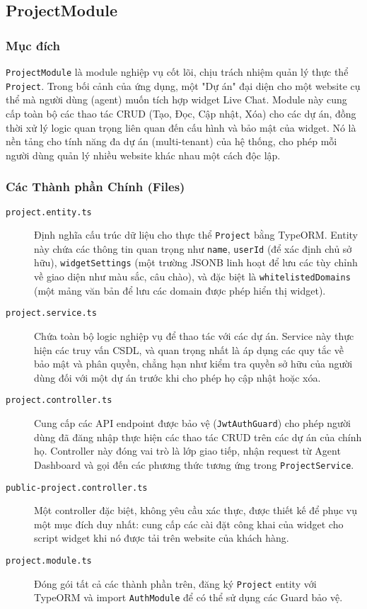 \subsection{ProjectModule}
\label{subsec:project-module}

\subsubsection{Mục đích}

\texttt{ProjectModule} là module nghiệp vụ cốt lõi, chịu trách nhiệm quản lý thực thể \texttt{Project}. Trong bối cảnh của ứng dụng, một "Dự án" đại diện cho một website cụ thể mà người dùng (agent) muốn tích hợp widget Live Chat. Module này cung cấp toàn bộ các thao tác CRUD (Tạo, Đọc, Cập nhật, Xóa) cho các dự án, đồng thời xử lý logic quan trọng liên quan đến cấu hình và bảo mật của widget. Nó là nền tảng cho tính năng đa dự án (multi-tenant) của hệ thống, cho phép mỗi người dùng quản lý nhiều website khác nhau một cách độc lập.

\subsubsection{Các Thành phần Chính (Files)}

\begin{description}
    \item[\texttt{project.entity.ts}] Định nghĩa cấu trúc dữ liệu cho thực thể \texttt{Project} bằng TypeORM. Entity này chứa các thông tin quan trọng như \texttt{name}, \texttt{userId} (để xác định chủ sở hữu), \texttt{widgetSettings} (một trường JSONB linh hoạt để lưu các tùy chỉnh về giao diện như màu sắc, câu chào), và đặc biệt là \texttt{whitelistedDomains} (một mảng văn bản để lưu các domain được phép hiển thị widget).
    
    \item[\texttt{project.service.ts}] Chứa toàn bộ logic nghiệp vụ để thao tác với các dự án. Service này thực hiện các truy vấn CSDL, và quan trọng nhất là áp dụng các quy tắc về bảo mật và phân quyền, chẳng hạn như kiểm tra quyền sở hữu của người dùng đối với một dự án trước khi cho phép họ cập nhật hoặc xóa.
    
    \item[\texttt{project.controller.ts}] Cung cấp các API endpoint được bảo vệ (\texttt{JwtAuthGuard}) cho phép người dùng đã đăng nhập thực hiện các thao tác CRUD trên các dự án của chính họ. Controller này đóng vai trò là lớp giao tiếp, nhận request từ Agent Dashboard và gọi đến các phương thức tương ứng trong \texttt{ProjectService}.
    
    \item[\texttt{public-project.controller.ts}] Một controller đặc biệt, không yêu cầu xác thực, được thiết kế để phục vụ một mục đích duy nhất: cung cấp các cài đặt công khai của widget cho script widget khi nó được tải trên website của khách hàng.
    
    \item[\texttt{project.module.ts}] Đóng gói tất cả các thành phần trên, đăng ký \texttt{Project} entity với TypeORM và import \texttt{AuthModule} để có thể sử dụng các Guard bảo vệ.
\end{description}

